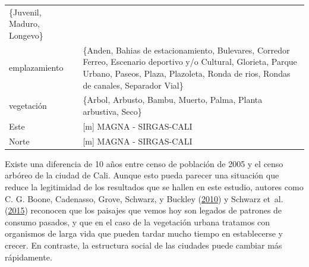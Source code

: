 \documentclass[12pt,a4paper,openany]{book}
\theoremstyle{definition}
\theoremstyle{definition}
\theoremstyle{definition}
\theoremstyle{remark}
\begin{document}
\begin{longtable}[]{@{}ll@{}}
\begin{minipage}[t]{0.42\columnwidth}
\{Juvenil, Maduro, Longevo\}\strut
\end{minipage}\tabularnewline
\begin{minipage}[t]{0.30\columnwidth}\raggedright\strut
emplazamiento\strut
\end{minipage} & \begin{minipage}[t]{0.42\columnwidth}\raggedright\strut
\{Anden, Bahias de estacionamiento, Bulevares, Corredor Ferreo,
Escenario deportivo y/o Cultural, Glorieta, Parque Urbano, Paseos,
Plaza, Plazoleta, Ronda de rios, Rondas de canales, Separador
Vial\}\strut
\end{minipage}\tabularnewline
\begin{minipage}[t]{0.30\columnwidth}\raggedright\strut
vegetación\strut
\end{minipage} & \begin{minipage}[t]{0.42\columnwidth}\raggedright\strut
\{Arbol, Arbusto, Bambu, Muerto, Palma, Planta arbustiva, Seco\}\strut
\end{minipage}\tabularnewline
\begin{minipage}[t]{0.30\columnwidth}\raggedright\strut
Este\strut
\end{minipage} & \begin{minipage}[t]{0.42\columnwidth}\raggedright\strut
{[}m{]} MAGNA - SIRGAS-CALI\strut
\end{minipage}\tabularnewline
\begin{minipage}[t]{0.30\columnwidth}\raggedright\strut
Norte\strut
\end{minipage} & \begin{minipage}[t]{0.42\columnwidth}\raggedright\strut
{[}m{]} MAGNA - SIRGAS-CALI\strut
\end{minipage}\tabularnewline
\bottomrule
\end{longtable}

Existe una diferencia de 10 años entre censo de población de 2005 y el
censo arbóreo de la ciudad de Cali. Aunque esto pueda parecer una
situación que reduce la legitimidad de los resultados que se hallen en
este estudio, autores como C. G. Boone, Cadenasso, Grove, Schwarz, y
Buckley (\protect\hyperlink{ref-boone2010landscape}{2010}) y Schwarz
et~al. (\protect\hyperlink{ref-schwarz_trees_2015}{2015}) reconocen que
los paisajes que vemos hoy son legados de patrones de consumo pasados, y
que en el caso de la vegetación urbana tratamos con organismos de larga
vida que pueden tardar mucho tiempo en establecerse y crecer. En
contraste, la estructura social de las ciudades puede cambiar más
rápidamente.
\end{document}
